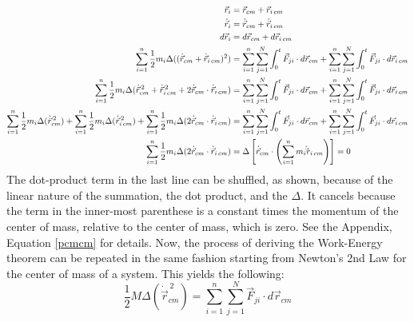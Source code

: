 \documentclass[10pt]{article}
\begin{document}
\begin{align}
    \vec{r}_i &= \vec{r}_{cm}+\vec{r}_{i\,cm} \notag\\
    \dot{\vec{r}}_i &= \dot{\vec{r}}_{cm}+\dot{\vec{r}}_{i\,cm} \notag\\
    d\vec{r}_i &= d\vec{r}_{cm}+d\vec{r}_{i\,cm} \notag\\
    \sum_{i=1}^n \frac{1}{2}m_i
        \Delta((\dot{\vec{r}}_{cm}+\dot{\vec{r}}_{i\,cm} )^{2}) &= 
        \sum_{i=1}^n \sum_{j=1}^N \int_{0}^{t} \vec{F}_{ji}\cdot 
        d\vec{r}_{cm}
        +\sum_{i=1}^n \sum_{j=1}^N \int_{0}^{t} \vec{F}_{ji}\cdot 
        d\vec{r}_{i\,cm} \notag\\
    \sum_{i=1}^n \frac{1}{2}m_i
        \Delta(\dot{\vec{r}}_{cm}^{\,2}+\dot{\vec{r}}_{i\,cm}^{\,2}
        +2\dot{\vec{r}}_{cm}\cdot\dot{\vec{r}}_{i\,cm}) &=
        \sum_{i=1}^n \sum_{j=1}^N \int_{0}^{t} \vec{F}_{ji}\cdot 
        d\vec{r}_{cm}
        +\sum_{i=1}^n \sum_{j=1}^N \int_{0}^{t} \vec{F}_{ji}\cdot 
        d\vec{r}_{i\,cm} \notag\\
    \sum_{i=1}^n \frac{1}{2}m_i\Delta(\dot{\vec{r}}_{cm}^{\,2})
        +\sum_{i=1}^n \frac{1}{2}m_i\Delta(\dot{\vec{r}}_{i\,cm}^{\,2})
        +\sum_{i=1}^n \frac{1}{2}m_i\Delta(
        2\dot{\vec{r}}_{cm}\cdot\dot{\vec{r}}_{i\,cm}) &= 
        \sum_{i=1}^n \sum_{j=1}^N \int_{0}^{t} \vec{F}_{ji}\cdot 
        d\vec{r}_{cm}
        +\sum_{i=1}^n \sum_{j=1}^N \int_{0}^{t} \vec{F}_{ji}\cdot 
        d\vec{r}_{i\,cm} \label{workenergysplit0} \\
    \sum_{i=1}^n \frac{1}{2}m_i\Delta(
        2\dot{\vec{r}}_{cm}\cdot\dot{\vec{r}}_{i\,cm}) &=
        \Delta\left[\dot{\vec{r}}_{cm}\cdot
        \left(\sum_{i=1}^nm_i\dot\vec{r}_{i\,cm}\right)\right] = 0\notag
\end{align}
The dot-product term in the last line can be shuffled, as shown,
because of the linear nature of the summation, the dot product, and 
the $\Delta$. It cancels because the term in the inner-most parenthese 
is a constant times the momentum of the center of mass, relative 
to the center of mass, which is zero. See the Appendix, Equation \ref{pcmcm} 
for details. Now, the process of deriving the Work-Energy theorem 
can be repeated in the same fashion starting from Newton's 2nd Law 
for the center of mass of a system. This yields the following:
\begin{equation}
    \frac{1}{2}M\Delta(\dot{\vec{r}}_{cm}^{\,2}) = 
        \sum_{i=1}^n\sum_{j=1}^N \vec{F}_{ji}\cdot d\vec{r}_{cm} 
        \label{workenergycm}
\end{equation}
\end{document}
